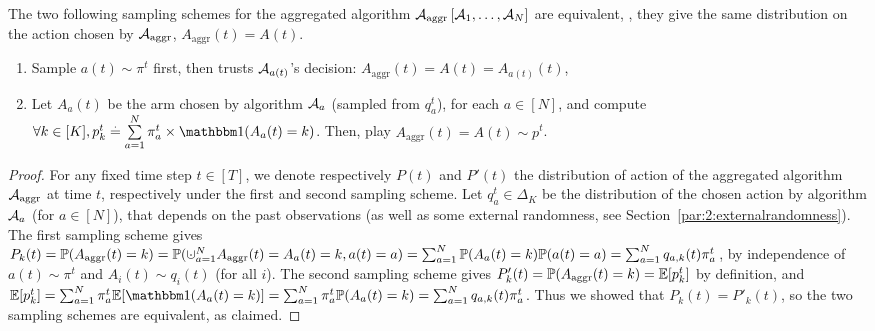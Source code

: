 \begin{proposition}\label{prop:25:equivalenceOfSamplingSchemes}
\begin{leftbar}[propositionbar]  %
	The two following sampling schemes for the aggregated algorithm $\mathcal{A}_{\mathrm{aggr}} \left[\mathcal{A}_1, \dots, \mathcal{A}_N\right]$ are equivalent,
	\ie, they give the same distribution on the action chosen by $\mathcal{A}_{\mathrm{aggr}}$, $A_{\mathrm{aggr}}(t) = A(t)$.
	\begin{enumerate}
		\item Sample $a(t)\sim \pi^t$ first, then trusts $\mathcal{A}_{a(t)}$'s decision: $A_{\mathrm{aggr}}(t) = A(t) = A_{a(t)}(t)$,
		\item Let $A_a(t)$ be the arm chosen by algorithm $\mathcal{A}_a$ (sampled from $q_a^t$), for each $a\in[N]$, and compute $\forall k\in[K], p^{t}_k \eqdef \sum\limits_{a = 1}^{N} \pi^{t}_a \times \indic(A_a(t) = k)$. Then, play $A_{\mathrm{aggr}}(t) = A(t) \sim p^t$.
	\end{enumerate}
\end{leftbar}  %
\end{proposition}
\begin{proof}
	For any fixed time step $t\in[T]$,
	we denote respectively $P(t)$ and $P'(t)$ the distribution of action of the aggregated algorithm $\mathcal{A}_{\mathrm{aggr}}$ at time $t$, respectively under the first and second sampling scheme.
	Let $q_a^t\in\Delta_K$ be the distribution of the chosen action by algorithm $\mathcal{A}_a$  (for $a\in[N]$), that depends on the past observations (as well as some external randomness, see Section~\ref{par:2:externalrandomness}).
		The first sampling scheme gives
		$P_k(t) = \bP(A_{\mathrm{aggr}}(t) = k) = \bP(\cupdot_{a=1}^N A_{\mathrm{aggr}}(t) = A_a(t) = k, a(t) = a) = \sum_{a=1}^N \bP(A_a(t) = k) \bP(a(t) = a) = \sum_{a=1}^N q_{a,k}(t) \pi_a^t$,
		by independence of $a(t)\sim \pi^t$ and $A_i(t) \sim q_i(t)$ (for all $i$).
		The second sampling scheme gives
		$P'_k(t) = \mathbb{P}(A_{\mathrm{aggr}}(t) = k) = \mathbb{E}[p_k^t]$ by definition,
		and $\E[p_k^t] = \sum_{a = 1}^{N} \pi^{t}_a \E[\indic(A_a(t) = k)] = \sum_{a = 1}^{N} \pi^{t}_a \bP(A_a(t) = k) = \sum_{a=1}^N q_{a,k}(t) \pi_a^t$.
	Thus we showed that $P_k(t) = P'_k(t)$, so the two sampling schemes are equivalent, as claimed.
\end{proof}

